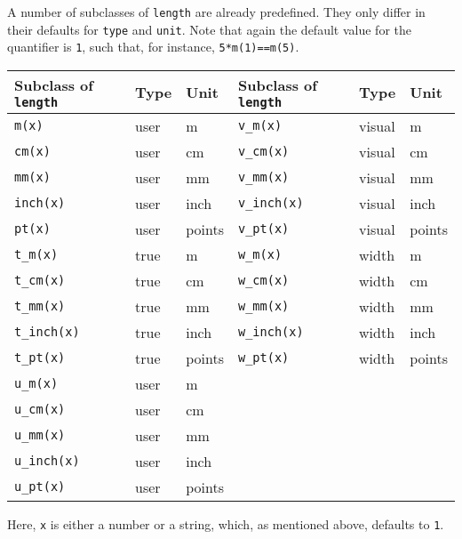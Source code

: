 A number of subclasses of \verb|length| are already predefined.  They
only differ in their defaults for \verb|type| and \verb|unit|. Note
that again the default value for the quantifier is \verb|1|, such
that, for instance, \texttt{5*m(1)==m(5)}.

\medskip
\begin{center}
\begin{tabular}{lll|lll}
Subclass of \texttt{length} & Type & Unit & Subclass of \texttt{length} & Type & Unit\\
\hline
\texttt{m(x)} & user & m & \texttt{v\_m(x)} & visual & m\\
\texttt{cm(x)} & user & cm & \texttt{v\_cm(x)} & visual & cm\\
\texttt{mm(x)} & user & mm & \texttt{v\_mm(x)} & visual & mm\\
\texttt{inch(x)} & user & inch & \texttt{v\_inch(x)} & visual & inch\\
\texttt{pt(x)} & user & points & \texttt{v\_pt(x)} & visual & points\\
\texttt{t\_m(x)} & true & m & \texttt{w\_m(x)} & width & m\\
\texttt{t\_cm(x)} & true & cm & \texttt{w\_cm(x)} & width & cm\\
\texttt{t\_mm(x)} & true & mm & \texttt{w\_mm(x)} & width & mm\\
\texttt{t\_inch(x)} & true & inch & \texttt{w\_inch(x)} & width & inch\\
\texttt{t\_pt(x)} & true & points & \texttt{w\_pt(x)} & width & points\\
\texttt{u\_m(x)} & user & m & \\
\texttt{u\_cm(x)} & user & cm & \\
\texttt{u\_mm(x)} & user & mm & \\
\texttt{u\_inch(x)} & user & inch & \\
\texttt{u\_pt(x)} & user & points & \\

\end{tabular}
\end{center}
\medskip
Here, \verb|x| is either a number or a string, which, as mentioned
above, defaults to \texttt{1}.

